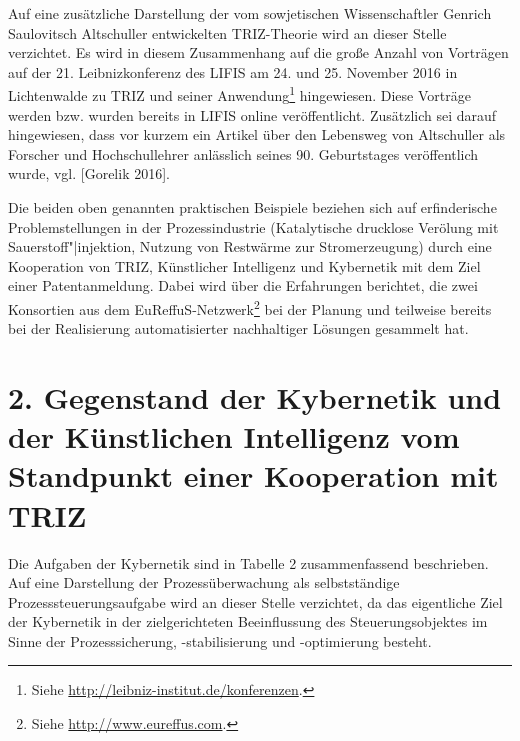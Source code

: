 \documentclass[11pt,a4paper]{article}
\begin{document}
Auf eine zusätzliche Darstellung der vom sowjetischen Wissenschaftler Genrich
Saulovitsch Altschuller entwickelten TRIZ-Theorie wird an dieser Stelle
verzichtet. Es wird in diesem Zusammenhang auf die große Anzahl von Vorträgen
auf der 21. Leibnizkonferenz des LIFIS am 24. und 25. November 2016 in
Lichtenwalde zu TRIZ und seiner Anwendung\footnote{Siehe
  \url{http://leibniz-institut.de/konferenzen}.}  hingewiesen. Diese Vorträge
werden bzw. wurden bereits in LIFIS online veröffentlicht. Zusätzlich sei
darauf hingewiesen, dass vor kurzem ein Artikel über den Lebensweg von
Altschuller als Forscher und Hochschullehrer anlässlich seines
90. Geburtstages veröffentlich wurde, vgl. [Gorelik 2016].

Die beiden oben genannten praktischen Beispiele beziehen sich auf
erfinderische Problemstellungen in der Prozessindustrie (Katalytische
drucklose Verölung mit Sauerstoff"|injektion, Nutzung von Restwärme zur
Stromerzeugung) durch eine Kooperation von TRIZ, Künstlicher Intelligenz und
Kybernetik mit dem Ziel einer Patentanmeldung. Dabei wird über die Erfahrungen
berichtet, die zwei Konsortien aus dem EuReffuS-Netzwerk\footnote{Siehe
  \url{http://www.eureffus.com}.} bei der Planung und teilweise bereits bei der
Realisierung automatisierter nachhaltiger Lösungen gesammelt hat.
  
\section*{2. Gegenstand der Kybernetik und der Künstlichen Intelligenz vom
  Standpunkt einer Kooperation mit TRIZ} 

Die Aufgaben der Kybernetik sind in Tabelle 2 zusammenfassend beschrieben. Auf
eine Darstellung der Prozessüberwachung als selbstständige
Prozesssteuerungsaufgabe wird an dieser Stelle verzichtet, da das eigentliche
Ziel der Kybernetik in der zielgerichteten Beeinflussung des
Steuerungsobjektes im Sinne der Prozesssicherung, -stabilisierung und
-optimierung besteht.
\end{document}
